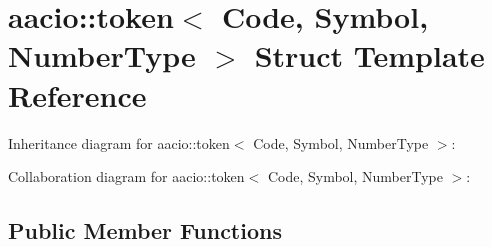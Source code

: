 \hypertarget{classaacio_1_1token}{}\section{aacio\+:\+:token$<$ Code, Symbol, Number\+Type $>$ Struct Template Reference}
\label{classaacio_1_1token}


Inheritance diagram for aacio\+:\+:token$<$ Code, Symbol, Number\+Type $>$\+:


Collaboration diagram for aacio\+:\+:token$<$ Code, Symbol, Number\+Type $>$\+:
\subsection*{Public Member Functions}
